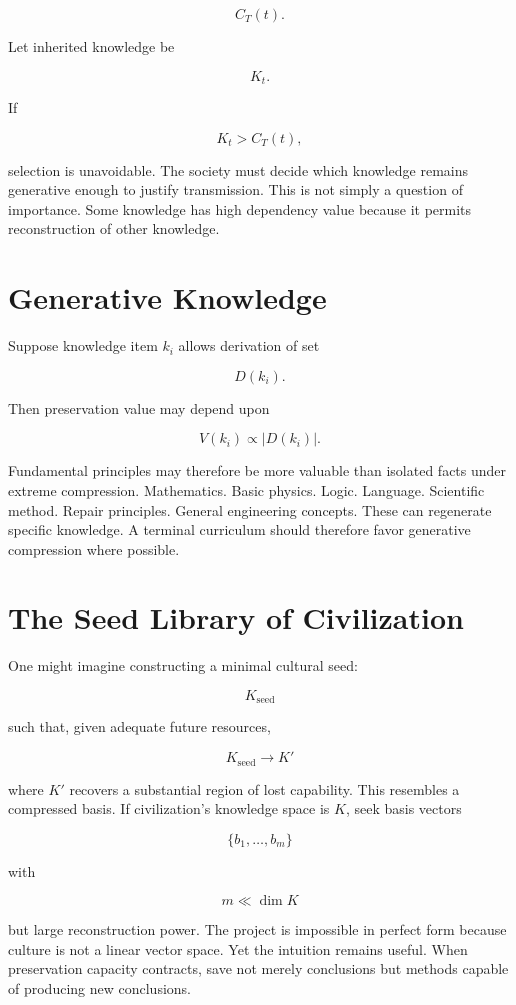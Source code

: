 \documentclass[11pt,oneside]{book}
\theoremstyle{definition}
\theoremstyle{remark}
\begin{document}
\[
C_T(t).
\]

Let inherited knowledge be

\[
K_t.
\]

If

\[
K_t>C_T(t),
\]

selection is unavoidable. The society must decide which knowledge remains generative enough to
justify transmission. This is not simply a question of importance. Some knowledge has high
dependency value because it permits reconstruction of other knowledge.

\section{Generative Knowledge}

Suppose knowledge item \(k_i\) allows derivation of set

\[
D(k_i).
\]

Then preservation value may depend upon

\[
V(k_i) \propto |D(k_i)|.
\]

Fundamental principles may therefore be more valuable than isolated facts under extreme compression.
Mathematics. Basic physics. Logic. Language. Scientific method. Repair principles. General
engineering concepts. These can regenerate specific knowledge. A terminal curriculum should
therefore favor generative compression where possible.

\section{The Seed Library of Civilization}

One might imagine constructing a minimal cultural seed:

\[
K_{\mathrm{seed}}
\]

such that, given adequate future resources,

\[
K_{\mathrm{seed}} \rightarrow K'
\]

where \(K'\) recovers a substantial region of lost capability. This resembles a compressed basis. If
civilization's knowledge space is \(K\), seek basis vectors

\[
\{b_1,\ldots,b_m\}
\]

with

\[
m\ll \dim K
\]

but large reconstruction power. The project is impossible in perfect form because culture is not a
linear vector space. Yet the intuition remains useful. When preservation capacity contracts, save
not merely conclusions but methods capable of producing new conclusions.
\end{document}

